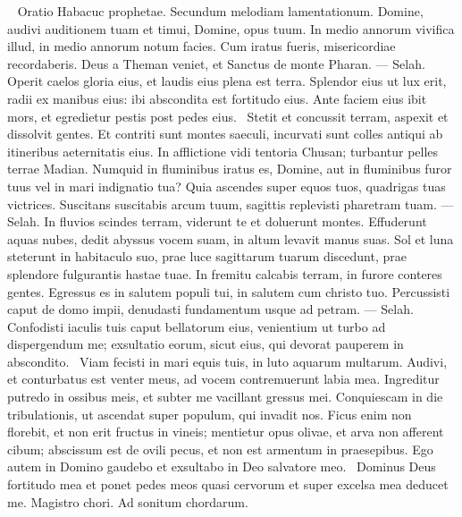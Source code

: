 \begin{biblechapter}   
\verse Oratio Habacuc prophetae. Secundum melodiam lamentationum. 
\verse Domine, audivi auditionem tuam et timui, Domine, opus tuum. In medio annorum vivifica illud, in medio annorum notum facies. Cum iratus fueris, misericordiae recordaberis. 
\verse Deus a Theman veniet, et Sanctus de monte Pharan. — Selah. Operit caelos gloria eius, et laudis eius plena est terra. 
\verse Splendor eius ut lux erit, radii ex manibus eius: ibi abscondita est fortitudo eius. 
\verse Ante faciem eius ibit mors, et egredietur pestis post pedes eius.  
\verse Stetit et concussit terram, aspexit et dissolvit gentes. Et contriti sunt montes saeculi, incurvati sunt colles antiqui ab itineribus aeternitatis eius. 
\verse In afflictione vidi tentoria Chusan; turbantur pelles terrae Madian. 
\verse Numquid in fluminibus iratus es, Domine, aut in fluminibus furor tuus vel in mari indignatio tua? Quia ascendes super equos tuos, quadrigas tuas victrices. 
\verse Suscitans suscitabis arcum tuum, sagittis replevisti pharetram tuam. — Selah. In fluvios scindes terram, 
\verse viderunt te et doluerunt montes. Effuderunt aquas nubes, dedit abyssus vocem suam, in altum levavit manus suas. 
\verse Sol et luna steterunt in habitaculo suo, prae luce sagittarum tuarum discedunt, prae splendore fulgurantis hastae tuae. 
\verse In fremitu calcabis terram, in furore conteres gentes. 
\verse Egressus es in salutem populi tui, in salutem cum christo tuo. Percussisti caput de domo impii, denudasti fundamentum usque ad petram. — Selah. 
\verse Confodisti iaculis tuis caput bellatorum eius, venientium ut turbo ad dispergendum me; exsultatio eorum, sicut eius, qui devorat pauperem in abscondito.  
\verse Viam fecisti in mari equis tuis, in luto aquarum multarum. 
\verse Audivi, et conturbatus est venter meus, ad vocem contremuerunt labia mea. Ingreditur putredo in ossibus meis, et subter me vacillant gressus mei. Conquiescam in die tribulationis, ut ascendat super populum, qui invadit nos. 
\verse Ficus enim non florebit, et non erit fructus in vineis; mentietur opus olivae, et arva non afferent cibum; abscissum est de ovili pecus, et non est armentum in praesepibus. 
\verse Ego autem in Domino gaudebo et exsultabo in Deo salvatore meo.  
\verse Dominus Deus fortitudo mea et ponet pedes meos quasi cervorum et super excelsa mea deducet me. Magistro chori. Ad sonitum chordarum.   
\end{biblechapter}
